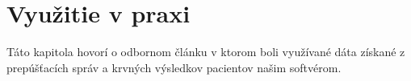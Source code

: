 \chapter{Využitie v praxi}

\label{kap:prax} 

Táto kapitola hovorí o odbornom článku v ktorom boli využívané dáta získané z prepúšťacích správ a krvných výsledkov pacientov našim softvérom. 